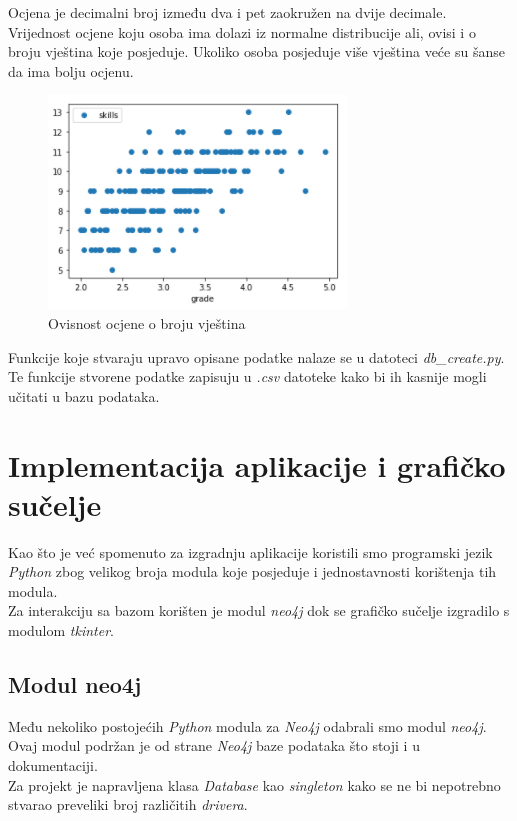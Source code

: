\documentclass[titlepage, 12pt]{scrartcl}
\begin{document}
	Ocjena je decimalni broj između dva i pet zaokružen na dvije decimale. Vrijednost ocjene koju osoba ima dolazi iz normalne distribucije ali, ovisi i o broju vještina koje posjeduje. Ukoliko osoba posjeduje više vještina veće su šanse da ima bolju ocjenu.
	\begin{figure}[h]
		\centering
		\includegraphics{slike/Grades.png}
		\caption{Ovisnost ocjene o broju vještina}
		\label{fig:hobbies}
	\end{figure}
	
	Funkcije koje stvaraju upravo opisane podatke nalaze se u datoteci \emph{db\_create.py}. 
	Te funkcije stvorene podatke zapisuju u \emph{.csv} datoteke kako bi ih kasnije mogli učitati u bazu podataka.  
	\newpage
	
	\section{Implementacija aplikacije i grafičko sučelje}
	Kao što je već spomenuto za izgradnju aplikacije koristili smo programski jezik \emph{Python} zbog velikog broja modula koje posjeduje i jednostavnosti korištenja tih modula. \\
	Za interakciju sa bazom korišten je modul \emph{neo4j} dok se grafičko sučelje izgradilo s modulom \emph{tkinter}.
	\subsection{Modul neo4j}
	Među nekoliko postojećih \emph{Python} modula za \emph{Neo4j} odabrali smo modul \emph{neo4j}. Ovaj modul podržan je od strane \emph{Neo4j} baze podataka što stoji i u dokumentaciji.\\
	Za projekt je napravljena klasa \emph{Database} kao \emph{singleton} kako se ne bi nepotrebno stvarao preveliki broj različitih \emph{drivera}.
	
\end{document}
